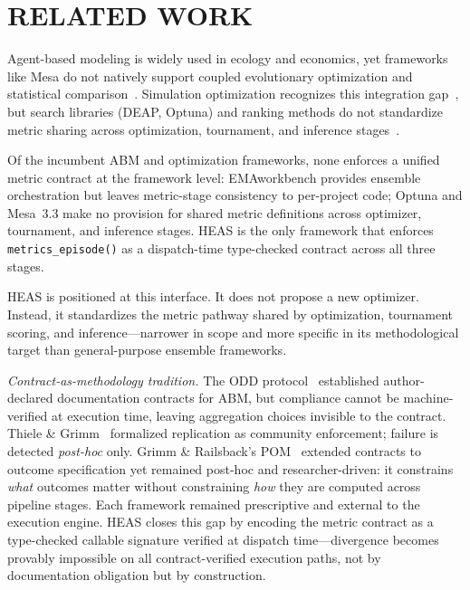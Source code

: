 \documentclass{wscpaperproc}
\begin{document}
\section{RELATED WORK}

Agent-based modeling is widely used in ecology and economics, yet frameworks
like Mesa do not natively support coupled evolutionary optimization and
statistical comparison~\cite{kazil2020mesa}. Simulation optimization recognizes
this integration gap~\cite{fu2002optimization}, but search libraries (DEAP,
Optuna) and ranking methods do not standardize metric sharing across
optimization, tournament, and inference stages~\cite{fortin2012deap,akiba2019optuna}.


Of the incumbent ABM and optimization frameworks, none enforces a unified metric
contract at the framework level: EMAworkbench provides ensemble orchestration but
leaves metric-stage consistency to per-project code; Optuna and Mesa~3.3 make no
provision for shared metric definitions across optimizer, tournament, and inference
stages. HEAS is the only framework that enforces \texttt{metrics\_episode()} as a
dispatch-time type-checked contract across all three stages.

HEAS is positioned at this interface. It does not propose a new optimizer.
Instead, it standardizes the metric pathway shared by optimization, tournament
scoring, and inference---narrower in scope and more specific in its methodological target
than general-purpose ensemble frameworks.

\textit{Contract-as-methodology tradition.}
The ODD protocol~\cite{grimm2006odd} established author-declared documentation
contracts for ABM, but compliance cannot be machine-verified at execution time,
leaving aggregation choices invisible to the contract. Thiele \&
Grimm~\cite{thiele2015replicating} formalized replication as community enforcement;
failure is detected \emph{post-hoc} only. Grimm \& Railsback's
POM~\cite{grimm2012pattern} extended contracts to outcome specification yet
remained post-hoc and researcher-driven: it constrains \emph{what} outcomes matter
without constraining \emph{how} they are computed across pipeline stages. Each
framework remained prescriptive and external to the execution engine. HEAS closes
this gap by encoding the metric contract as a type-checked callable signature
verified at dispatch time---divergence becomes provably impossible on all
contract-verified execution paths, not by documentation obligation but by
construction.
\end{document}
